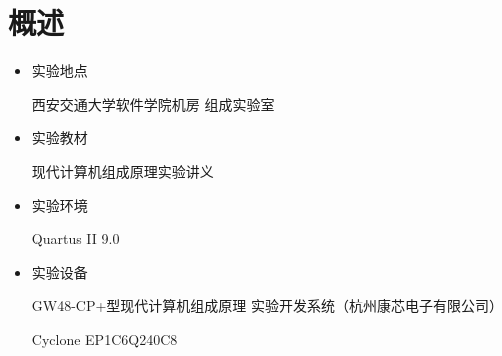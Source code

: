 \chapter*{概述}

\begin{itemize}
    \item 实验地点
    
    西安交通大学软件学院机房 组成实验室
    
    \item 实验教材
    
    现代计算机组成原理实验讲义
    
    \item 实验环境
    
    Quartus II 9.0
    
    \item 实验设备
    
    GW48-CP+型现代计算机组成原理 实验开发系统（杭州康芯电子有限公司）
    
    Cyclone EP1C6Q240C8
    
\end{itemize}
